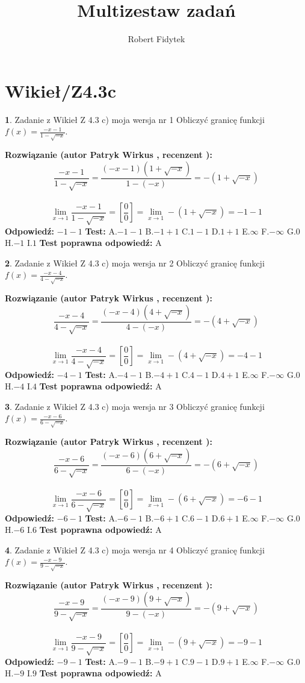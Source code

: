 \documentclass[12pt, a4paper]{article}
\title{Multizestaw zadań}
\author{Robert Fidytek}
\date{}
\theoremstyle{definition} %
\newtheorem{zad}{}
\newcommand{\kategoria}[1]{\section{#1}}
\newcommand{\zadStart}[1]{\begin{zad}#1\newline}
\newcommand{\zadStop}{\end{zad}}
\newcommand{\rozwStart}[2]{\noindent \textbf{Rozwiązanie (autor #1 , recenzent #2): }\newline}
\newcommand{\rozwStop}{\newline}
\newcommand{\odpStart}{\noindent \textbf{Odpowiedź:}\newline}
\newcommand{\odpStop}{\newline}
\newcommand{\testStart}{\noindent \textbf{Test:}\newline}
\newcommand{\testStop}{\newline}
\newcommand{\kluczStart}{\noindent \textbf{Test poprawna odpowiedź:}\newline}
\newcommand{\kluczStop}{\newline}
\begin{document}
\maketitle

\kategoria{Wikieł/Z4.3c}


\zadStart{Zadanie z Wikieł Z 4.3 c) moja wersja nr 1}
Obliczyć granicę funkcji $f(x)=\frac{-x-1}{1-\sqrt{-x}}$.
\zadStop
\rozwStart{Patryk Wirkus}{}
$$\frac{-x-1}{1-\sqrt{-x}}=\frac{(-x-1)(1+\sqrt{-x})}{1-(-x)}=-(1+\sqrt{-x})$$
\\
$$\lim\limits_{x\to1}\frac{-x-1}{1-\sqrt{-x}}=[\frac{0}{0}]=\lim\limits_{x\to1}-(1+\sqrt{-x}) =-1-1$$
\rozwStop
\odpStart
$-1-1$
\odpStop
\testStart
A.$-1-1$
B.$-1+1$
C.$1-1$
D.$1+1$
E.$\infty$
F.$-\infty$
G.$0$
H.$-1$
I.$1$
\testStop
\kluczStart
A
\kluczStop



\zadStart{Zadanie z Wikieł Z 4.3 c) moja wersja nr 2}
Obliczyć granicę funkcji $f(x)=\frac{-x-4}{4-\sqrt{-x}}$.
\zadStop
\rozwStart{Patryk Wirkus}{}
$$\frac{-x-4}{4-\sqrt{-x}}=\frac{(-x-4)(4+\sqrt{-x})}{4-(-x)}=-(4+\sqrt{-x})$$
\\
$$\lim\limits_{x\to1}\frac{-x-4}{4-\sqrt{-x}}=[\frac{0}{0}]=\lim\limits_{x\to1}-(4+\sqrt{-x}) =-4-1$$
\rozwStop
\odpStart
$-4-1$
\odpStop
\testStart
A.$-4-1$
B.$-4+1$
C.$4-1$
D.$4+1$
E.$\infty$
F.$-\infty$
G.$0$
H.$-4$
I.$4$
\testStop
\kluczStart
A
\kluczStop



\zadStart{Zadanie z Wikieł Z 4.3 c) moja wersja nr 3}
Obliczyć granicę funkcji $f(x)=\frac{-x-6}{6-\sqrt{-x}}$.
\zadStop
\rozwStart{Patryk Wirkus}{}
$$\frac{-x-6}{6-\sqrt{-x}}=\frac{(-x-6)(6+\sqrt{-x})}{6-(-x)}=-(6+\sqrt{-x})$$
\\
$$\lim\limits_{x\to1}\frac{-x-6}{6-\sqrt{-x}}=[\frac{0}{0}]=\lim\limits_{x\to1}-(6+\sqrt{-x}) =-6-1$$
\rozwStop
\odpStart
$-6-1$
\odpStop
\testStart
A.$-6-1$
B.$-6+1$
C.$6-1$
D.$6+1$
E.$\infty$
F.$-\infty$
G.$0$
H.$-6$
I.$6$
\testStop
\kluczStart
A
\kluczStop



\zadStart{Zadanie z Wikieł Z 4.3 c) moja wersja nr 4}
Obliczyć granicę funkcji $f(x)=\frac{-x-9}{9-\sqrt{-x}}$.
\zadStop
\rozwStart{Patryk Wirkus}{}
$$\frac{-x-9}{9-\sqrt{-x}}=\frac{(-x-9)(9+\sqrt{-x})}{9-(-x)}=-(9+\sqrt{-x})$$
\\
$$\lim\limits_{x\to1}\frac{-x-9}{9-\sqrt{-x}}=[\frac{0}{0}]=\lim\limits_{x\to1}-(9+\sqrt{-x}) =-9-1$$
\rozwStop
\odpStart
$-9-1$
\odpStop
\testStart
A.$-9-1$
B.$-9+1$
C.$9-1$
D.$9+1$
E.$\infty$
F.$-\infty$
G.$0$
H.$-9$
I.$9$
\testStop
\kluczStart
A
\kluczStop
\end{document}
